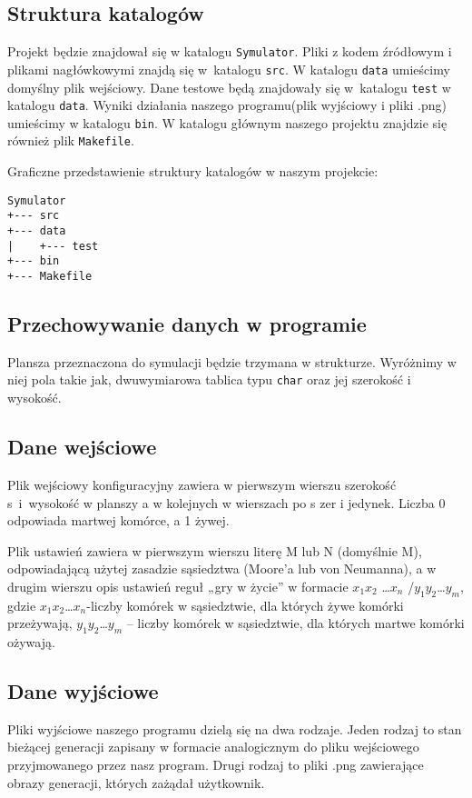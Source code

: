 \documentclass[a4paper,11pt, notitlepage ]{article}
\begin{document}
\subsection{Struktura katalogów}
Projekt będzie znajdował się w katalogu \verb+Symulator+.  Pliki z kodem źródłowym i plikami nagłówkowymi znajdą się w~katalogu \verb+src+. W katalogu \verb+data+ umieścimy domyślny plik wejściowy. Dane testowe będą znajdowały się w~katalogu \verb+test+ w katalogu \verb+data+. Wyniki działania naszego programu(plik wyjściowy i pliki .png) umieścimy w katalogu \verb+bin+. W katalogu głównym naszego projektu znajdzie się również plik \verb+Makefile+.

Graficzne przedstawienie struktury katalogów w naszym projekcie:
\begin{verbatim}
Symulator
+--- src
+--- data
|    +--- test
+--- bin
+--- Makefile
\end{verbatim}
\subsection{Przechowywanie danych w programie}
 Plansza przeznaczona do symulacji będzie trzymana w strukturze. Wyróżnimy w niej pola takie jak, dwuwymiarowa tablica typu \verb+char+ oraz jej szerokość i wysokość.
\subsection{Dane wejściowe}
 Plik wejściowy konfiguracyjny zawiera w pierwszym wierszu szerokość s~i~wysokość w planszy a w kolejnych w wierszach po s zer i jedynek. Liczba 0 odpowiada martwej komórce, a 1 żywej.

Plik ustawień zawiera w pierwszym wierszu literę M lub N (domyślnie M), odpowiadającą użytej zasadzie sąsiedztwa (Moore’a lub von Neumanna), a w drugim wierszu opis ustawień reguł „gry w życie” w formacie $x_{1}x_{2}$ \ldots $x_{n}$ /$y_{1}y_{2}$\ldots $y_{m}$, gdzie $x_{1}x_{2}$\ldots $x_{n}$-liczby komórek w sąsiedztwie, dla których żywe komórki przeżywają, $y_{1}y_{2}$\ldots $y_{m}$ – liczby komórek w sąsiedztwie, dla których martwe komórki ożywają.
\subsection{Dane wyjściowe}
Pliki wyjściowe naszego programu dzielą się na dwa rodzaje. Jeden rodzaj to stan bieżącej generacji zapisany w formacie analogicznym do pliku wejściowego przyjmowanego przez nasz program. Drugi rodzaj to pliki .png zawierające obrazy generacji, których zażądał użytkownik.
\end{document}
